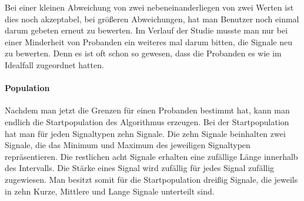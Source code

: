 Bei einer kleinen Abweichung von zwei nebeneinanderliegen von zwei Werten ist dies noch akzeptabel, bei gr{\"o}{\ss}eren Abweichungen, hat man Benutzer noch einmal darum gebeten erneut zu bewerten. Im Verlauf der Studie musste man nur bei einer Minderheit von Probanden ein weiteres mal darum bitten, die Signale neu zu bewerten. Denn es ist oft schon so gewesen, dass die Probanden es wie im Idealfall zugeordnet hatten.

\paragraph{Population}

Nachdem man jetzt die Grenzen f{\"u}r einen Probanden bestimmt hat, kann man endlich die Startpopulation des Algorithmus erzeugen. 
Bei der Startpopulation hat man f{\"u}r jeden Signaltypen zehn Signale. 
Die zehn Signale beinhalten zwei Signale, die das Minimum und Maximum des jeweiligen Signaltypen repr{\"a}sentieren. Die restlichen acht Signale erhalten eine zuf{\"a}llige L{\"a}nge innerhalb des Intervalls. Die St{\"a}rke eines Signal wird zuf{\"a}llig f{\"u}r jedes Signal zuf{\"a}llig zugewiesen. 
Man besitzt somit f{\"u}r die Startpopulation drei{\ss}ig Signale, die jeweils in zehn Kurze, Mittlere und Lange Signale unterteilt sind. 





